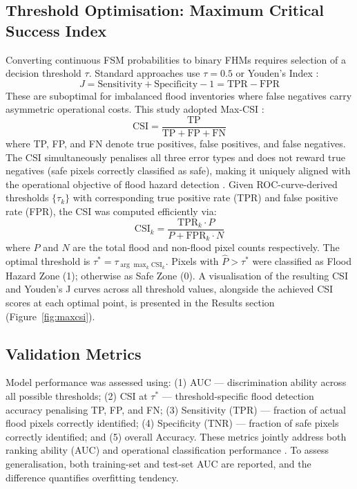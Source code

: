 \documentclass[12pt, a4paper]{article}
\begin{document}
\subsection{Threshold Optimisation: Maximum Critical Success Index}

Converting continuous FSM probabilities to binary FHMs requires selection of a decision threshold $\tau$. Standard approaches use $\tau = 0.5$ or Youden's Index \citep{youden1950}:
\begin{equation}
    J = \text{Sensitivity} + \text{Specificity} - 1 = \text{TPR} - \text{FPR}
\end{equation}
These are suboptimal for imbalanced flood inventories where false negatives carry asymmetric operational costs. This study adopted Max-CSI \citep{schaefer1990, wilks2019}:
\begin{equation}
    \text{CSI} = \frac{\text{TP}}{\text{TP} + \text{FP} + \text{FN}}
\end{equation}
where TP, FP, and FN denote true positives, false positives, and false negatives. The CSI simultaneously penalises all three error types and does not reward true negatives (safe pixels correctly classified as safe), making it uniquely aligned with the operational objective of flood hazard detection \citep{mason2003, Pham2021}. Given ROC-curve-derived thresholds $\{\tau_k\}$ with corresponding true positive rate (TPR) and false positive rate (FPR), the CSI was computed efficiently via:
\begin{equation}
    \text{CSI}_k = \frac{\text{TPR}_k \cdot P}{P + \text{FPR}_k \cdot N}
\end{equation}
where $P$ and $N$ are the total flood and non-flood pixel counts respectively. The optimal threshold is $\tau^* = \tau_{\arg\max_k \text{CSI}_k}$. Pixels with $\hat{P} > \tau^*$ were classified as Flood Hazard Zone (1); otherwise as Safe Zone (0). A visualisation of the resulting CSI and Youden's J curves across all threshold values, alongside the achieved CSI scores at each optimal point, is presented in the Results section (Figure~\ref{fig:maxcsi}).

\subsection{Validation Metrics}

Model performance was assessed using: (1) AUC --- discrimination ability across all possible thresholds; (2) CSI at $\tau^*$ --- threshold-specific flood detection accuracy penalising TP, FP, and FN; (3) Sensitivity (TPR) --- fraction of actual flood pixels correctly identified; (4) Specificity (TNR) --- fraction of safe pixels correctly identified; and (5) overall Accuracy. These metrics jointly address both ranking ability (AUC) and operational classification performance \citep{Fawcett2006, Powers2011}. To assess generalisation, both training-set and test-set AUC are reported, and the difference quantifies overfitting tendency.
\end{document}
